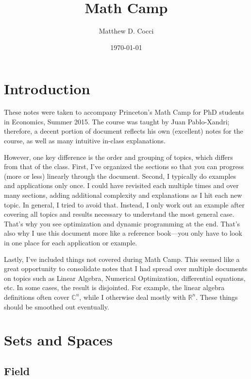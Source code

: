 \documentclass[12pt]{article}
\author{Matthew D. Cocci}
\title{Math Camp}
\date{\today}
\numberwithin{equation}{section} %
\theoremstyle{plain}
\theoremstyle{definition}
\theoremstyle{remark}
\newcommand{\Rn}{\mathbb{R}^n}
\newcommand{\Cn}{\mathbb{C}^n}
\begin{document}
\maketitle

\tableofcontents



\clearpage
\section{Introduction}

These notes were taken to accompany Princeton's Math Camp for PhD
students in Economics, Summer 2015. The course was taught by Juan
Pablo-Xandri; therefore, a decent portion of document reflects his own
(excellent) notes for the course, as well as many intuitive in-class
explanations.

However, one key difference is the order and grouping of topics, which
differs from that of the class. First, I've organized the sections so
that you can progress (more or less) linearly through the document.
Second, I typically do examples and applications only once. I could have
revisited each multiple times and over many sections, adding additional
complexity and explanations as I hit each new topic. In general, I tried
to avoid that. Instead, I only work out an example after covering all
topics and results necessary to understand the most general case.
That's why you see optimization and dynamic programming at the end.
That's also why I use this document more like a reference book---you
only have to look in one place for each application or example.

Lastly, I've included things not covered during Math Camp. This seemed
like a great opportunity to consolidate notes that I had spread over
multiple documents on topics such as Linear Algebra, Numerical
Optimization, differential equations, etc. In some cases, the result is
disjointed. For example, the linear algebra definitions often cover
$\Cn$, while I otherwise deal mostly with $\Rn$. These things should be
smoothed out eventually.


\clearpage

\section{Sets and Spaces}

\subsection{Field}
\end{document}
